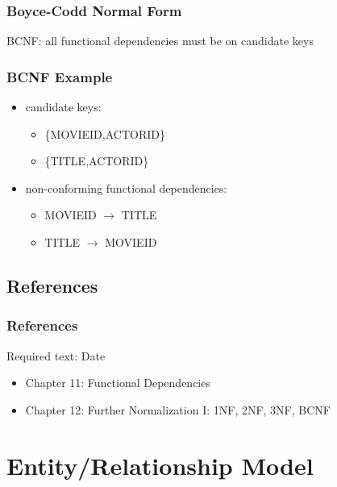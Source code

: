 \documentclass[dvipsnames]{beamer}
\begin{document}
\begin{frame}
  \frametitle{Boyce-Codd Normal Form}

  \begin{definition}
    \alert{BCNF}: all functional dependencies must be on candidate keys
  \end{definition}
\end{frame}

\begin{frame}
  \frametitle{BCNF Example}

  \begin{example}
    \begin{itemize}
      \item candidate keys:
      \begin{itemize}
        \item \{MOVIEID,ACTORID\}
        \item \{TITLE,ACTORID\}
      \end{itemize}

      \pause
      \item non-conforming functional dependencies:
      \begin{itemize}
        \item MOVIEID $\rightarrow$ TITLE
        \item TITLE $\rightarrow$ MOVIEID
      \end{itemize}
    \end{itemize}
  \end{example}
\end{frame}

\subsection*{References}

\begin{frame}
  \frametitle{References}

  \begin{block}{Required text: Date}
    \begin{itemize}
      \item Chapter 11: \alert{Functional Dependencies}
      \item Chapter 12: \alert{Further Normalization I: 1NF, 2NF, 3NF, BCNF}
    \end{itemize}
  \end{block}
\end{frame}

\section{Entity/Relationship Model}
\end{document}
